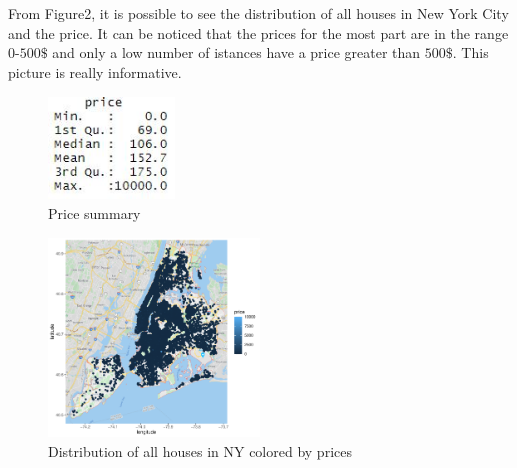 \documentclass{FR16}
\begin{document}
\\
\\From Figure2, it is possible to see the distribution of all houses in New York City and the price. It can be noticed that the prices for the most part are in the range $0$-$500\$$ and only a low number of istances have a price greater than $500\$$. This picture is really  informative.
 \begin{figure}[H]
\centering
\includegraphics[width=0.3\textwidth]{figures/figure1.jpg} 
\caption{\label{fig:1}Price summary}
\end{figure}
\begin{figure}[H]
\centering
\includegraphics[width=0.5\textwidth]{figures/figure2.pdf} 
\caption{\label{fig:2}Distribution of all houses in NY colored by prices}
\end{figure}
\end{document}

